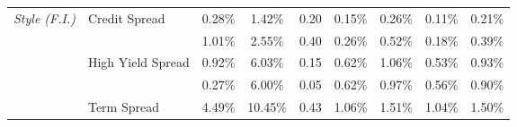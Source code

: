 \documentclass[12pt]{article}
\begin{document}
\begin{table}[H]
{\begin{tabular}{@{}llccccccc@{}}
\textit{Style (F.I.)}         & Credit Spread                                          & 0.28\%                                                      & 1.42\%                                                          & 0.20                                                   & 0.15\%                                                        & 0.26\%                                                       & 0.11\%                                                        & 0.21\%                                                      \\
                              &                                                        & {\color[HTML]{303498} 1.01\%}                               & {\color[HTML]{303498} 2.55\%}                                   & {\color[HTML]{303498} 0.40}                            & {\color[HTML]{303498} 0.26\%}                                 & {\color[HTML]{303498} 0.52\%}                                & {\color[HTML]{303498} 0.18\%}                                 & {\color[HTML]{303498} 0.39\%}                               \\
                              & High Yield Spread                                      & 0.92\%                                                      & 6.03\%                                                          & 0.15                                                   & 0.62\%                                                        & 1.06\%                                                       & 0.53\%                                                        & 0.93\%                                                      \\
                              &                                                        & {\color[HTML]{303498} 0.27\%}                               & {\color[HTML]{303498} 6.00\%}                                   & {\color[HTML]{303498} 0.05}                            & {\color[HTML]{303498} 0.62\%}                                 & {\color[HTML]{303498} 0.97\%}                                & {\color[HTML]{303498} 0.56\%}                                 & {\color[HTML]{303498} 0.90\%}                               \\
                              & Term Spread                                            & 4.49\%                                                      & 10.45\%                                                         & 0.43                                                   & 1.06\%                                                        & 1.51\%                                                       & 1.04\%                                                        & 1.50\%                                                      \\

\end{tabular}}
\end{table}
\end{document}
